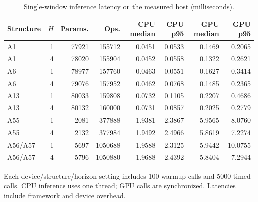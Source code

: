 \begin{table}[!htbp]
\centering\footnotesize
\caption{Single-window inference latency on the measured host (milliseconds).}\label{tab:s-latency}
\begin{tabular}{lrrrrrrr}
\toprule
Structure & $H$ & Params. & Ops. & CPU median & CPU p95 & GPU median & GPU p95\\\midrule
A1 & 1 & 77921 & 155712 & 0.0451 & 0.0533 & 0.1469 & 0.2065\\
A1 & 4 & 78020 & 155904 & 0.0452 & 0.0558 & 0.1322 & 0.2621\\
A6 & 1 & 78977 & 157760 & 0.0463 & 0.0551 & 0.1627 & 0.3414\\
A6 & 4 & 79076 & 157952 & 0.0462 & 0.0768 & 0.1485 & 0.2365\\
A13 & 1 & 80033 & 159808 & 0.0732 & 0.1105 & 0.2207 & 0.4686\\
A13 & 4 & 80132 & 160000 & 0.0731 & 0.0857 & 0.2025 & 0.2779\\
A55 & 1 & 2081 & 377888 & 1.9381 & 2.3867 & 5.9565 & 8.0760\\
A55 & 4 & 2132 & 377984 & 1.9492 & 2.4966 & 5.8619 & 7.2274\\
A56/A57 & 1 & 5697 & 1050688 & 1.9588 & 2.3125 & 5.9442 & 10.0755\\
A56/A57 & 4 & 5796 & 1050880 & 1.9688 & 2.4392 & 5.8404 & 7.2944\\
\bottomrule\end{tabular}
\par\vspace{3pt}\begin{minipage}{\linewidth}\footnotesize Each device/structure/horizon setting includes 100 warmup calls and 5000 timed calls. CPU inference uses one thread; GPU calls are synchronized. Latencies include framework and device overhead.\end{minipage}
\end{table}
